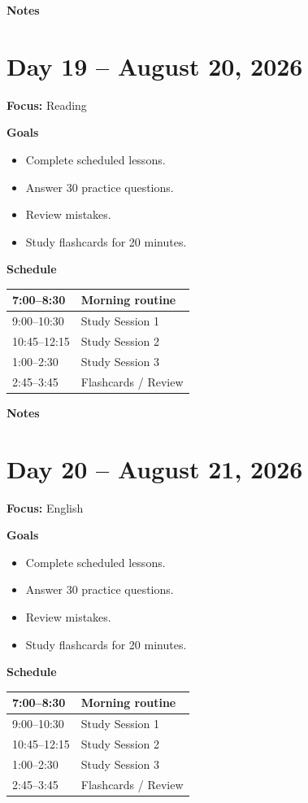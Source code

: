 \vspace{1em}
\textbf{Notes}

\vspace{8cm}

\newpage

\section*{Day 19 -- August 20, 2026}
\textbf{Focus:} Reading

\textbf{Goals}
\begin{itemize}
\item Complete scheduled lessons.
\item Answer 30 practice questions.
\item Review mistakes.
\item Study flashcards for 20 minutes.
\end{itemize}

\textbf{Schedule}
\begin{tabular}{|p{4cm}|p{10cm}|}\hline
7:00--8:30 & Morning routine \\\hline
9:00--10:30 & Study Session 1 \\\hline
10:45--12:15 & Study Session 2 \\\hline
1:00--2:30 & Study Session 3 \\\hline
2:45--3:45 & Flashcards / Review \\\hline
\end{tabular}

\vspace{1em}
\textbf{Notes}

\vspace{8cm}

\newpage

\section*{Day 20 -- August 21, 2026}
\textbf{Focus:} English

\textbf{Goals}
\begin{itemize}
\item Complete scheduled lessons.
\item Answer 30 practice questions.
\item Review mistakes.
\item Study flashcards for 20 minutes.
\end{itemize}

\textbf{Schedule}
\begin{tabular}{|p{4cm}|p{10cm}|}\hline
7:00--8:30 & Morning routine \\\hline
9:00--10:30 & Study Session 1 \\\hline
10:45--12:15 & Study Session 2 \\\hline
1:00--2:30 & Study Session 3 \\\hline
2:45--3:45 & Flashcards / Review \\\hline
\end{tabular}

